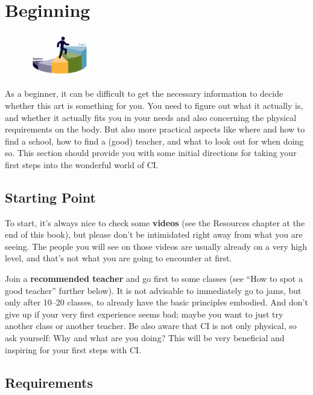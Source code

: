 \chapter{Beginning}\label{ch:beginning}

\begin{figure}
    \centering
    \includegraphics[width=0.25\textwidth]{images/beginning}
\end{figure}

As a beginner, it can be difficult to get the necessary information to decide whether this art is something for you.
You need to figure out what it actually is, and whether it actually fits you in your needs and also concerning the physical requirements on the body.
But also more practical aspects like where and how to find a school, how to find a (good) teacher, and what to look out for when doing so.
This section should provide you with some initial directions for taking your first steps into the wonderful world of CI\@.

\section{Starting Point}\label{sec:starting-point}

To start, it's always nice to check some \textbf{videos} (see the Resources chapter at the end of this book), but please don't be intimidated right away from what you are seeing.
The people you will see on those videos are usually already on a very high level, and that's not what you are going to encounter at first.

Join a \textbf{recommended teacher} and go first to some classes (see ``How to spot a good teacher'' further below).
It is not advisable to immediately go to jams, but only after 10--20 classes, to already have the basic principles embodied.
And don't give up if your very first experience seems bad; maybe you want to just try another class or another teacher.
Be also aware that CI is not only physical, so ask yourself: Why and what are you doing?
This will be very beneficial and inspiring for your first steps with CI\@.

\section{Requirements}\label{sec:requirements}

